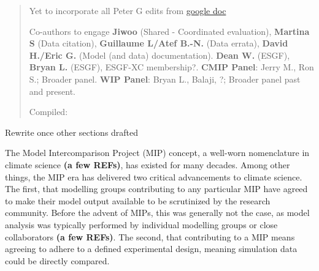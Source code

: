 \documentclass[gmd, preprint]{copernicus}
\def\cred#1{{\color{red}#1}}
\begin{document}
\begin{abstract}
\cred{
Yet to incorporate all Peter G edits from \href{https://docs.google.com/document/d/1l9e0kBbXHG55jFroicRbM-_gaRhTVulMr_F6S3aLQGQ/edit}{google doc}
}


\cred{Co-authors to engage}
\textbf{Jiwoo} (Shared - Coordinated evaluation), \textbf{Martina S} (Data citation), \textbf{Guillaume L/Atef B.-N.} (Data errata), \textbf{David H./Eric G.} (Model (and data) documentation).
\textbf{Dean W.} (ESGF), \textbf{Bryan L.} (ESGF), ESGF-XC membership?.
\textbf{CMIP Panel}: Jerry M., Ron S.; Broader panel.
\textbf{WIP Panel}: Bryan L., Balaji, ?; Broader panel past and present.

{Compiled: \DTMnow}

\end{abstract}



\introduction  %
\cred{Rewrite once other sections drafted}

The Model Intercomparison Project (MIP) concept, a well-worn nomenclature in climate science \cred{\textbf{(a few REFs)}}, has existed for many decades. Among other things, the MIP era has delivered two critical advancements to climate science. The first, that modelling groups contributing to any particular MIP have agreed to make their model output available to be scrutinized by the research community. Before the advent of MIPs, this was generally not the case, as model analysis was typically performed by individual modelling groups or close collaborators \cred{\textbf{(a few REFs)}}. The second, that contributing to a MIP means agreeing to adhere to a defined experimental design, meaning simulation data could be directly compared.
\end{document}
